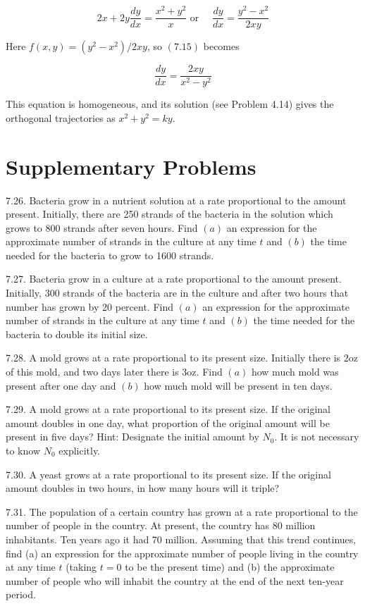 \documentclass[10pt]{article}
\begin{document}
$$
2 x+2 y \frac{d y}{d x}=\frac{x^{2}+y^{2}}{x} \text { or } \quad \frac{d y}{d x}=\frac{y^{2}-x^{2}}{2 x y}
$$

Here $f(x, y)=\left(y^{2}-x^{2}\right) / 2 x y$, so $(7.15)$ becomes

$$
\frac{d y}{d x}=\frac{2 x y}{x^{2}-y^{2}}
$$

This equation is homogeneous, and its solution (see Problem 4.14) gives the orthogonal trajectories as $x^{2}+y^{2}=k y$.

\section*{Supplementary Problems}
7.26. Bacteria grow in a nutrient solution at a rate proportional to the amount present. Initially, there are 250 strands of the bacteria in the solution which grows to 800 strands after seven hours. Find $(a)$ an expression for the approximate number of strands in the culture at any time $t$ and $(b)$ the time needed for the bacteria to grow to 1600 strands.

7.27. Bacteria grow in a culture at a rate proportional to the amount present. Initially, 300 strands of the bacteria are in the culture and after two hours that number has grown by 20 percent. Find $(a)$ an expression for the approximate number of strands in the culture at any time $t$ and $(b)$ the time needed for the bacteria to double its initial size.

7.28. A mold grows at a rate proportional to its present size. Initially there is $2 \mathrm{oz}$ of this mold, and two days later there is $3 \mathrm{oz}$. Find $(a)$ how much mold was present after one day and $(b)$ how much mold will be present in ten days.

7.29. A mold grows at a rate proportional to its present size. If the original amount doubles in one day, what proportion of the original amount will be present in five days? Hint: Designate the initial amount by $N_{0}$. It is not necessary to know $N_{0}$ explicitly.

7.30. A yeast grows at a rate proportional to its present size. If the original amount doubles in two hours, in how many hours will it triple?

7.31. The population of a certain country has grown at a rate proportional to the number of people in the country. At present, the country has 80 million inhabitants. Ten years ago it had 70 million. Assuming that this trend continues, find (a) an expression for the approximate number of people living in the country at any time $t$ (taking $t=0$ to be the present time) and (b) the approximate number of people who will inhabit the country at the end of the next ten-year period.
\end{document}
